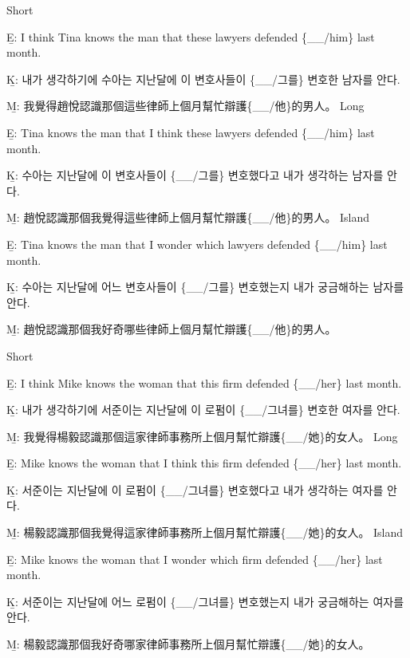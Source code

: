 \pex %
\a Short\par\nobreak
\beginsubsub
\b{E:} I think Tina knows the man that these lawyers defended \{\_\_/him\} last month. \par\nobreak
\b{K:} \ko 내가 생각하기에 수아는 지난달에 이 변호사들이 \{\_\_/그를\} 변호한 남자를 안다. \normalfont\par\nobreak
\b{M:} \zh 我覺得趙悅認識那個這些律師上個月幫忙辯護\{\_\_/他\}的男人。 \normalfont
\endsubsub
\a Long\par\nobreak
\beginsubsub
\b{E:} Tina knows the man that I think these lawyers defended \{\_\_/him\} last month. \par\nobreak
\b{K:} \ko 수아는 지난달에 이 변호사들이 \{\_\_/그를\} 변호했다고 내가 생각하는 남자를 안다. \normalfont\par\nobreak
\b{M:} \zh 趙悅認識那個我覺得這些律師上個月幫忙辯護\{\_\_/他\}的男人。 \normalfont
\endsubsub
\a Island\par\nobreak
\beginsubsub
\b{E:} Tina knows the man that I wonder which lawyers defended \{\_\_/him\} last month.\par\nobreak
\b{K:} \ko 수아는 지난달에 어느 변호사들이 \{\_\_/그를\} 변호했는지 내가 궁금해하는 남자를 안다\normalfont.\par\nobreak
\b{M:} \zh 趙悅認識那個我好奇哪些律師上個月幫忙辯護\{\_\_/他\}的男人。\normalfont
\endsubsub
\xe

\pex %
\a Short\par\nobreak
\beginsubsub
\b{E:} I think Mike knows the woman that this firm defended \{\_\_/her\} last month. \par\nobreak
\b{K:} \ko 내가 생각하기에 서준이는 지난달에 이 로펌이 \{\_\_/그녀를\} 변호한 여자를 안다. \normalfont\par\nobreak
\b{M:} \zh 我覺得楊毅認識那個這家律師事務所上個月幫忙辯護\{\_\_/她\}的女人。 \normalfont
\endsubsub
\a Long\par\nobreak
\beginsubsub
\b{E:} Mike knows the woman that I think this firm defended \{\_\_/her\} last month. \par\nobreak
\b{K:} \ko 서준이는 지난달에 이 로펌이 \{\_\_/그녀를\} 변호했다고 내가 생각하는 여자를 안다. \normalfont\par\nobreak
\b{M:} \zh 楊毅認識那個我覺得這家律師事務所上個月幫忙辯護\{\_\_/她\}的女人。 \normalfont
\endsubsub
\a Island\par\nobreak
\beginsubsub
\b{E:} Mike knows the woman that I wonder which firm defended \{\_\_/her\} last month.\par\nobreak
\b{K:} \ko 서준이는 지난달에 어느 로펌이 \{\_\_/그녀를\} 변호했는지 내가 궁금해하는 여자를 안다\normalfont.\par\nobreak
\b{M:} \zh 楊毅認識那個我好奇哪家律師事務所上個月幫忙辯護\{\_\_/她\}的女人。\normalfont
\endsubsub
\xe

